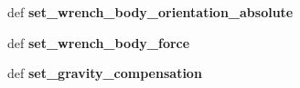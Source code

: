 \begin{DoxyCompactItemize}
\item 
\hypertarget{classarm_1_1arm_a7618e46b1cc3e78223a380916b4a1b5f}{def {\bfseries set\-\_\-wrench\-\_\-body\-\_\-orientation\-\_\-absolute}}\label{classarm_1_1arm_a7618e46b1cc3e78223a380916b4a1b5f}

\item 
\hypertarget{classarm_1_1arm_a4f82912fa4e339d843797fa2cd081e21}{def {\bfseries set\-\_\-wrench\-\_\-body\-\_\-force}}\label{classarm_1_1arm_a4f82912fa4e339d843797fa2cd081e21}

\item 
\hypertarget{classarm_1_1arm_a43aa38c319efe3c76d1de2c7f37c49de}{def {\bfseries set\-\_\-gravity\-\_\-compensation}}\label{classarm_1_1arm_a43aa38c319efe3c76d1de2c7f37c49de}

\end{DoxyCompactItemize}
